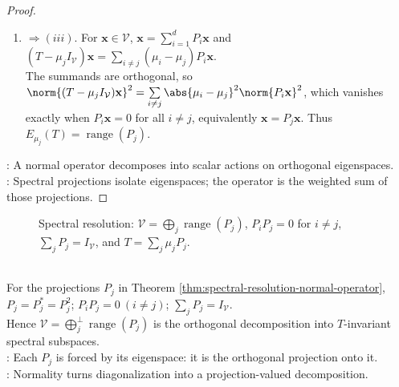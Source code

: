 \begin{theorem}
\begin{proof}
\begin{enumerate}[label=(\roman*).]
Because $\sum_jP_j=I_{\mathcal{V}}$, at least one $P_k\mathbf{x}$ is nonzero, so $\mu_k=\lambda$. Thus $\operatorname{spec}(T)\subseteq\{\mu_1,\ldots,\mu_d\}$.
\item[$(ii)$]$\Rightarrow (iii)$. For $\mathbf{x}\in\mathcal{V}$, $\mathbf{x} =\sum\limits_{i=1}^{d}P_i\mathbf{x}$ and $(T-\mu_jI_{\mathcal{V}})\mathbf{x} =\sum\limits_{i\neq j}(\mu_i-\mu_j)P_i\mathbf{x}$.\\
The summands are orthogonal, so $\norm{(T-\mu_jI_{\mathcal{V}})\mathbf{x}}^2 =\sum\limits_{i\neq j}\abs{\mu_i-\mu_j}^2\norm{P_i\mathbf{x}}^2$,
which vanishes exactly when $P_i\mathbf{x}=0$ for all $i\neq j$, equivalently $\mathbf{x}=P_j\mathbf{x}$. Thus $E_{\mu_j}(T)=\operatorname{range}(P_j)$.
\end{enumerate}
: A normal operator decomposes into scalar actions on orthogonal eigenspaces.\\
: Spectral projections isolate eigenspaces; the operator is the weighted sum of those projections.
\end{proof}
\end{theorem}

\begin{figure}[H]
  \centering
  
  \caption{Spectral resolution: $\mathcal{V}=\bigoplus_j\operatorname{range}(P_j)$, $P_iP_j=0$ for $i\neq j$, $\sum_jP_j=I_{\mathcal{V}}$, and $T=\sum_j\mu_jP_j$.}
  \label{fig:spectral-resolution-projectors}
\end{figure}

\begin{perspective} \label{per:spectral-resolution-as-orthogonal-resolution} \\
For the projections $P_j$ in Theorem \ref{thm:spectral-resolution-normal-operator}, $P_j=P_j^*=P_j^2$; $P_iP_j=0\ (i\neq j)$; $\sum_jP_j=I_{\mathcal{V}}$.\\
Hence $\mathcal{V}=\bigoplus_j^{\perp}\operatorname{range}(P_j)$ is the orthogonal decomposition into $T$-invariant spectral subspaces.\\
: Each $P_j$ is forced by its eigenspace: it is the orthogonal projection onto it.\\
: Normality turns diagonalization into a projection-valued decomposition.
\end{perspective}

